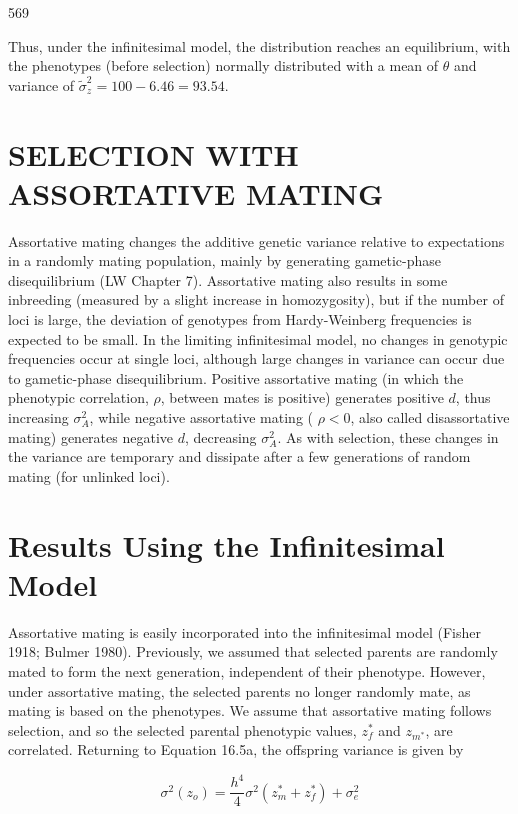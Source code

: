\documentclass{article}
\begin{document}
569

Thus, under the infinitesimal model, the distribution reaches an equilibrium, with the phenotypes (before selection) normally distributed with a mean of  $ \theta $ and variance of  $ \widetilde{\sigma}_{z}^{2} = 100 - 6.46 = 93.54 $.

\section{SELECTION WITH ASSORTATIVE MATING}
Assortative mating changes the additive genetic variance relative to expectations in a randomly mating population, mainly by generating gametic-phase disequilibrium (LW Chapter 7). Assortative mating also results in some inbreeding (measured by a slight increase in homozygosity), but if the number of loci is large, the deviation of genotypes from Hardy-Weinberg frequencies is expected to be small. In the limiting infinitesimal model, no changes in genotypic frequencies occur at single loci, although large changes in variance can occur due to gametic-phase disequilibrium. Positive assortative mating (in which the phenotypic correlation,  $ \rho $, between mates is positive) generates positive  $ d $, thus increasing  $ \sigma_A^2 $, while negative assortative mating ( $ \rho < 0 $, also called disassortative mating) generates negative  $ d $, decreasing  $ \sigma_A^2 $. As with selection, these changes in the variance are temporary and dissipate after a few generations of random mating (for unlinked loci).

\section{Results Using the Infinitesimal Model}
Assortative mating is easily incorporated into the infinitesimal model (Fisher 1918; Bulmer 1980). Previously, we assumed that selected parents are randomly mated to form the next generation, independent of their phenotype. However, under assortative mating, the selected parents no longer randomly mate, as mating is based on the phenotypes. We assume that assortative mating follows selection, and so the selected parental phenotypic values,  $ z_f^* $ and  $ z_{m^*} $, are correlated. Returning to Equation 16.5a, the offspring variance is given by

\begin{equation}
\sigma^{2}(z_{o})=\frac{h^{4}}{4}\sigma^{2}\left(z_{m}^{*}+z_{f}^{*}\right)+\sigma_{e}^{2}
\tag{16.21a}
\label{eq:16_21a}
\end{equation}
\end{document}
